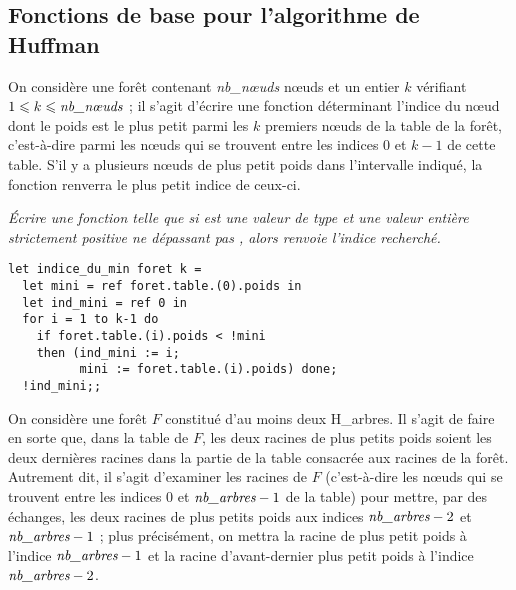 \subsection{Fonctions de base pour l’algorithme de Huffman}
On considère une forêt contenant {\it nb\_nœuds} nœuds et un entier $k$ vérifiant $1 \le k \le \text{\it nb\_nœuds}$ ; il
s’agit d’écrire une fonction déterminant l’indice du nœud dont le poids est le plus petit parmi les $k$
premiers nœuds de la table de la forêt, c’est-à-dire parmi les nœuds qui se trouvent entre les indices 0 et
$k - 1$ de cette table. S’il y a plusieurs nœuds de plus petit poids dans l’intervalle indiqué, la fonction
renverra le plus petit indice de ceux-ci.
\begin{Exercise}[label = ques:min]\it 
Écrire une fonction  telle que si  est une valeur de type  et  une valeur entière strictement positive ne dépassant pas , alors  renvoie l’indice recherché.
\end{Exercise}
\begin{Answer}
\begin{lstlisting}
let indice_du_min foret k =
  let mini = ref foret.table.(0).poids in
  let ind_mini = ref 0 in
  for i = 1 to k-1 do
    if foret.table.(i).poids < !mini
    then (ind_mini := i;
          mini := foret.table.(i).poids) done;
  !ind_mini;;
\end{lstlisting}
\end{Answer}
\medskip
On considère une forêt $F$ constitué d’au moins deux H\_arbres. Il s’agit de faire en sorte que, dans
la table de $F$, les deux racines de plus petits poids soient les deux dernières racines dans la partie de la
table consacrée aux racines de la forêt. Autrement dit, il s’agit d’examiner les racines de $F$ (c’est-à-dire
les nœuds qui se trouvent entre les indices 0 et $\text{\it nb\_arbres} - 1$ de la table) pour mettre, par des échanges,
les deux racines de plus petits poids aux indices $\text{\it nb\_arbres} - 2$ et $\text{\it nb\_arbres} - 1$ ; plus précisément, on mettra la racine de plus petit poids à l’indice $\text{\it nb\_arbres} - 1$ et la racine d’avant-dernier plus petit poids à l’indice $\text{\it nb\_arbres} - 2$. 

